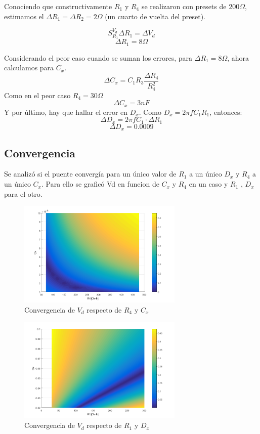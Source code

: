 \documentclass[../../main.tex]{subfiles}
\begin{document}
Conociendo que constructivamente $R_1$ y $R_4$ se realizaron con presets de $200\Omega$, estimamos el $\Delta R_1=\Delta R_2=2\Omega$ (un cuarto de vuelta del preset).

$$S_{R_1}^{V_d} \Delta R_1=\Delta V_d$$
$$\Delta R_1 = 8\Omega$$

Considerando el peor caso cuando se suman los errores, para $\Delta R_1 = 8\Omega$, ahora calculamos para $C_x$.
$$\Delta C_x = C_1 R_3 \frac{\Delta R_4}{R_4^2} $$
Como en el peor caso $R_4=30\Omega$
$$\Delta C_x=3nF $$
Y por \'ultimo, hay que hallar el error en $D_x$. Como $D_x=2\pi f  C_1 R_1$, entonces:
$$ \Delta D_x= 2 \pi  f  C_1 \cdot \Delta R_1 $$
$$ \Delta D_x=0.0009$$

\subsection{Convergencia}
Se analiz\'o si el puente converg\'ia para un \'unico valor de $R_1$ a un \'unico $D_x$ y $R_4$ a un \'unico $C_x$. Para ello se grafic\'o Vd en funcion de $C_x$ y $R_4$ en un caso y $R_1$ , $D_x$ para el otro.

\begin{figure}[H]	
	\centering
	\includegraphics[width=0.7\textwidth]{fotos/conv_cx.png}
	\caption{Convergencia de $V_d$ respecto de $R_4$ y $C_x$ } 
\end{figure}

\begin{figure}[H]	
	\centering
	\includegraphics[width=0.7\textwidth]{fotos/conv_dx.png}
	\caption{Convergencia de $V_d$ respecto de $R_1$ y $D_x$ } 
\end{figure}
\end{document}
